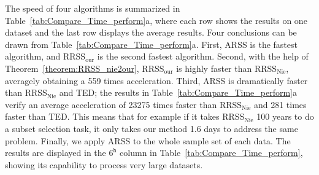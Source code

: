 \documentclass[a4paper]{article}
\begin{document}
The speed of four algorithms is summarized in Table\ \ref{tab:Compare_Time_perform}a,
where each row shows the results on one dataset and the last row displays
the average results. Four conclusions can be drawn from Table\ \ref{tab:Compare_Time_perform}a.
First, ARSS is the fastest algorithm, and RRSS$_{\text{our}}$ is
the second fastest algorithm. Second, with the help of Theorem\ \ref{theorem:RRSS_nie2our},
RRSS$_{\text{our}}$ is highly faster than RRSS$_{\text{Nie}}$, averagely
obtaining a 559 times acceleration. Third, ARSS is dramatically faster
than RRSS$_{\text{Nie}}$ and TED; the results in Table\ \ref{tab:Compare_Time_perform}a
verify an average acceleration of 23275 times faster than RRSS$_{\text{Nie}}$
and 281 times faster than TED. This means that for example if it takes
RRSS$_{\text{Nie}}$ 100 years to do a subset selection task, it only
takes our method 1.6 days to address the same problem. Finally, we
apply ARSS to the whole sample set of each data. The results are displayed
in the $6^{\mtth}$ column in Table\ \ref{tab:Compare_Time_perform},
showing its capability to process very large datasets. 
\end{document}

